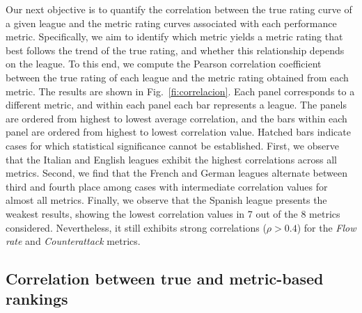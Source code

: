 \documentclass[preprint,12pt]{elsarticle}
\begin{document}
Our next objective is to quantify the correlation between the true rating curve of a given league and the metric rating curves associated with each performance metric. Specifically, we aim to identify which metric yields a metric rating that best follows the trend of the true rating, and whether this relationship depends on the league.
%
To this end, we compute the Pearson correlation coefficient between the true rating of each league and the metric rating obtained from each metric.
%
The results are shown in Fig.~\ref{fi:correlacion}. Each panel corresponds to a different metric, and within each panel each bar represents a league. The panels are ordered from highest to lowest average correlation, and the bars within each panel are ordered from highest to lowest correlation value. Hatched bars indicate cases for which statistical significance cannot be established.
%
First, we observe that the Italian and English leagues exhibit the highest correlations across all metrics.
Second, we find that the French and German leagues alternate between third and fourth place among cases with intermediate correlation values for almost all metrics.
Finally, we observe that the Spanish league presents the weakest results, showing the lowest correlation values in 7 out of the 8 metrics considered. Nevertheless, it still exhibits strong correlations ($\rho > 0.4$) for the {\it Flow rate} and {\it Counterattack} metrics.

\subsection{Correlation between true and metric-based rankings}
\label{sse:ken}
\end{document}

